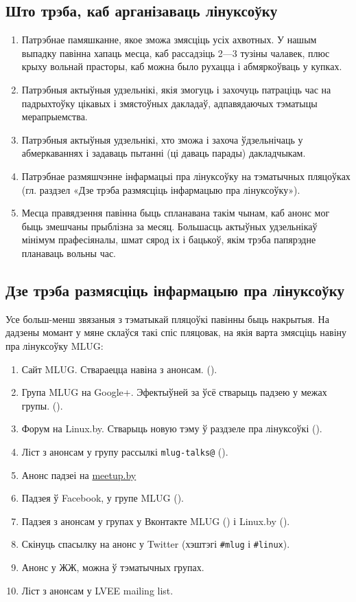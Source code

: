\documentclass[10pt, a5paper]{article}
\def\vv!#1!{\texttt{#1}}
\begin{document}
\subsection*{Што трэба, каб арганізаваць лінуксоўку}

\begin{enumerate}
  \item Патрэбнае памяшканне, якое зможа змясціць усіх ахвотных. У нашым выпадку павінна хапаць месца, каб рассадзіць 2—3 тузіны чалавек, плюс крыху вольнай прасторы, каб можна было рухацца і абмяркоўваць у купках.
  \item Патрэбныя актыўныя удзельнікі, якія змогуць і захочуць патраціць час на падрыхтоўку цікавых і змястоўных дакладаў, адпавядаючых тэматыцы мерапрыемства.
  \item Патрэбныя актыўныя удзельнікі, хто зможа і захоча ўдзельнічаць у абмеркаваннях і задаваць пытанні (ці даваць парады) дакладчыкам.
  \item Патрэбнае размяшчэнне інфармацыі пра лінуксоўку на тэматычных пляцоўках (гл. раздзел «Дзе трэба размясціць інфармацыю пра лінуксоўку»).
  \item Месца правядзення павінна быць спланавана такім чынам, каб анонс мог быць змешчаны прыблізна за месяц. Большасць актыўных удзельнікаў мінімум прафесіяналы, шмат сярод іх і бацькоў, якім трэба папярэдне планаваць вольны час.
\end{enumerate}

\subsection*{Дзе трэба размясціць інфармацыю пра лінуксоўку}

Усе больш-менш звязаныя з тэматыкай пляцоўкі павінны быць накрытыя. На дадзены момант у мяне склаўся такі спіс пляцовак, на якія варта змясціць навіну пра лінуксоўку MLUG:

\begin{enumerate}
  \item Сайт MLUG. Ствараецца навіна з анонсам. (\cite{mlug}).
  \item Група MLUG на Google+. Эфектыўней за ўсё стварыць падзею у межах групы. (\cite{mlug-gplus}).
  \item Форум на Linux.by. Стварыць новую тэму ў раздзеле пра лінуксоўкі (\cite{mlug-forum}).
  \item Ліст з анонсам у групу рассылкі \vv!mlug-talks@! (\cite{mlug-talks}).
  \item Анонс падзеі на \url{meetup.by}
  \item Падзея ў Facebook, у групе MLUG (\cite{mlug-fb}).
  \item Падзея з анонсам у групах у Вконтакте MLUG (\cite{mlug-vk-1}) і Linux.by (\cite{mlug-vk-2}).
  \item Скінуць спасылку на анонс у Twitter (хэштэгі \vv!\#mlug! і \vv!\#linux!).
  \item Анонс у ЖЖ, можна ў тэматычных групах.
  \item Ліст з анонсам у LVEE mailing list.
\end{enumerate}
\end{document}
